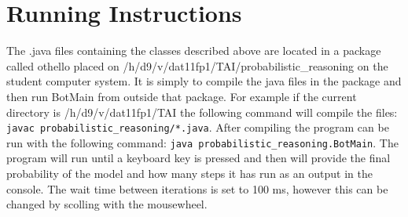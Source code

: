 \documentclass[a4paper]{article}
\begin{document}
\section{Running Instructions} The .java files containing the classes described
above are located in a package called othello placed on
/h/d9/v/dat11fp1/TAI/probabilistic\_reasoning on the student computer system. It
is simply to compile the java files in the package and then run BotMain from
outside that package. For example if the current directory is
/h/d9/v/dat11fp1/TAI the following command will compile the files: \texttt{javac
probabilistic\_reasoning/*.java}. After compiling the program can be run with
the following command: \texttt{java probabilistic\_reasoning.BotMain}. The program will run until a keyboard key is pressed and then will provide the final probability of the model and how many steps it has run as an output in the console. The wait time between iterations is set to 100 ms, however this can be changed by scolling with the mousewheel.

\end{document}

